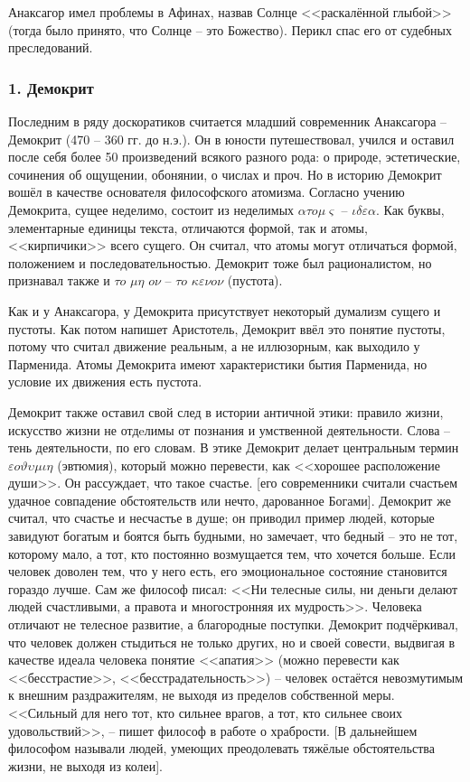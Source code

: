\documentclass[a4paper, 12pt]{book} %
\begin{document}
Анаксагор имел проблемы в Афинах, назвав Солнце <<раскалённой глыбой>> (тогда было принято, что Солнце -- это Божество). Перикл спас его от судебных преследований. 

\subsubsection*{1. Демокрит}
Последним в ряду доскоратиков считается младший современник Анаксагора -- Демокрит (470 -- 360 гг. до н.э.). Он в юности путешествовал, учился и оставил после себя более 50 произведений всякого разного рода: о природе, эстетические, сочинения об ощущении, обонянии, о числах и проч. Но в историю Демокрит вошёл в качестве основателя философского атомизма. Согласно учению Демокрита, сущее неделимо, состоит из неделимых $ \alpha \tau o \mu \varsigma $ -- $ \iota \delta \varepsilon \alpha $. Как буквы, элементарные единицы текста, отличаются формой, так и атомы, <<кирпичики>> всего сущего. Он считал, что атомы могут отличаться формой, положением и последовательностью. Демокрит тоже был рационалистом, но признавал также и $\tau o $ $\mu \eta $ $o \nu$ -- $\tau o $ $\kappa \varepsilon \nu o \nu$ (пустота).

Как и у Анаксагора, у Демокрита присутствует некоторый думализм сущего и пустоты. Как потом напишет Аристотель, Демокрит ввёл это понятие пустоты, потому что считал движение реальным,  а не иллюзорным, как выходило у Парменида. Атомы Демокрита имеют характеристики бытия Парменида, но условие их движения есть пустота.

Демокрит также оставил свой след в истории античной этики: правило жизни, искусство жизни не отдeлимы от познания и умственной деятельности. Слова -- тень деятельности, по его словам. В этике Демокрит делает центральным термин $\varepsilon o \vartheta \upsilon \mu \iota \eta$ (эвтюмия), который можно перевести, как <<хорошее расположение души>>. Он рассуждает, что такое счастье. [его современники считали счастьем удачное совпадение обстоятельств или нечто, дарованное Богами]. Демокрит же считал, что счастье и несчастье в душе; он приводил пример людей, которые завидуют богатым и боятся быть будными, но замечает, что бедный -- это не тот, которому мало, а тот, кто постоянно возмущается тем, что хочется больше. Если человек доволен тем, что у него есть, его эмоциональное состояние становится гораздо лучше. Сам же философ писал: <<Ни телесные силы, ни деньги делают людей счастливыми, а правота и многостронняя их мудрость>>. Человека отличают не телесное развитие, а благородные поступки. Демокрит подчёркивал, что человек должен стыдиться не только других, но и своей совести, выдвигая в качестве идеала человека понятие <<апатия>> (можно перевести как <<бесстрастие>>, <<бесстрадательность>>) -- человек остаётся невозмутимым к внешним раздражителям, не выходя из пределов собственной меры. <<Сильный для него тот, кто сильнее врагов, а тот, кто сильнее своих удовольствий>>, -- пишет философ в работе о храбрости. [В дальнейшем философом называли людей, умеющих преодолевать тяжёлые обстоятельства жизни, не выходя из колеи].
\end{document}
